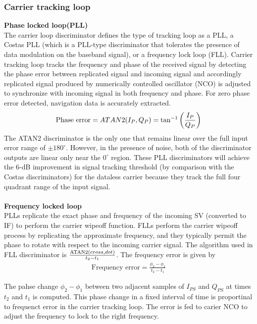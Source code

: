 \subsubsection{Carrier tracking loop}
\textbf{Phase locked loop(PLL)}\\
The carrier loop discriminator defines the type of tracking loop as a PLL, a Costas PLL (which is a PLL-type discriminator that tolerates the presence of data modulation on the baseband signal), or a frequency lock loop (FLL). Carrier tracking loop tracks the frequency and phase of the received signal by detecting the phase error between replicated signal and incoming signal and accordingly replicated signal produced by numerically controlled oscillator (NCO) is adjusted to synchronize with incoming signal in both frequency and phase. For zero phase error detected, navigation data is accurately extracted. 
\begin{align}
  \text{Phase error} =ATAN2(I_P,Q_P) = \tan^{-1}\left(\frac{I_P}{Q_P}\right)
\end{align}
The ATAN2 discriminator is the only one that remains linear over the full input error range of $\pm180^{\circ}$. However, in the presence of noise, both of the discriminator outputs are linear only near the $0^{\circ}$ region. These PLL discriminators will achieve the 6-dB improvement in signal tracking threshold (by comparison with the Costas discriminators) for the dataless carrier because they track the full four quadrant range of the input signal.
\\
\\
\textbf{Frequency locked loop}\\
PLLs replicate the exact phase and frequency of the incoming SV (converted to IF) to perform the carrier wipeoff function. FLLs perform the carrier wipeoff process by replicating the approximate frequency, and they typically permit the phase to rotate with respect to the incoming carrier signal. The algorithm used in FLL discriminator is $\frac{\text{ATAN2}{\ensuremath{\left(cross,dot\right)}}}{t_2-t_1}$. The frequency error is given by 
\begin{align}
	\text{Frequency error} = \frac{\phi_2-\phi_1}{t_2-t_1}
\end{align}

\noindent The pahse change $\phi_2 - \phi_1$ between two adjacent samples of $I_{PS}$ and $Q_{PS}$ at times $t_2$ and $t_1$ is computed. This phase change in a fixed interval of time is proportinal to frequenct error in the carrier tracking loop. The error is fed to carier NCO to adjust the frequency to lock to the right frequency.

